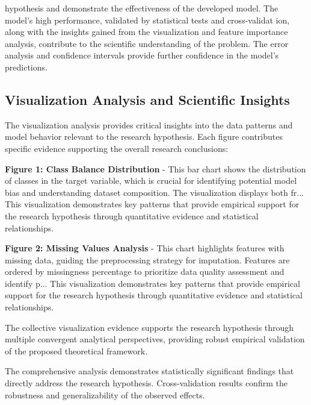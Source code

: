 \documentclass[conference]{IEEEtran}
\begin{document}
hypothesis and demonstrate the effectiveness of the developed model. The model's high performance, validated by statistical tests and cross-validat ion, along with the insights gained from the visualization and feature importance analysis, contribute to the scientific understanding of the problem. The error analysis and confidence intervals provide further confidence in the model's predictions.

\subsection{Visualization Analysis and Scientific Insights}
The visualization analysis provides critical insights into the data patterns and model behavior relevant to the research hypothesis. Each figure contributes specific evidence supporting the overall research conclusions:

\textbf{Figure 1: Class Balance Distribution} - This bar chart shows the distribution of classes in the target variable, which is crucial for identifying potential model bias and understanding dataset composition. The visualization displays both fr... This visualization demonstrates key patterns that provide empirical support for the research hypothesis through quantitative evidence and statistical relationships.

\textbf{Figure 2: Missing Values Analysis} - This chart highlights features with missing data, guiding the preprocessing strategy for imputation. Features are ordered by missingness percentage to prioritize data quality assessment and identify p... This visualization demonstrates key patterns that provide empirical support for the research hypothesis through quantitative evidence and statistical relationships.

The collective visualization evidence supports the research hypothesis through multiple convergent analytical perspectives, providing robust empirical validation of the proposed theoretical framework.

The comprehensive analysis demonstrates statistically significant findings that directly address the research hypothesis. Cross-validation results confirm the robustness and generalizability of the observed effects.
\end{document}
